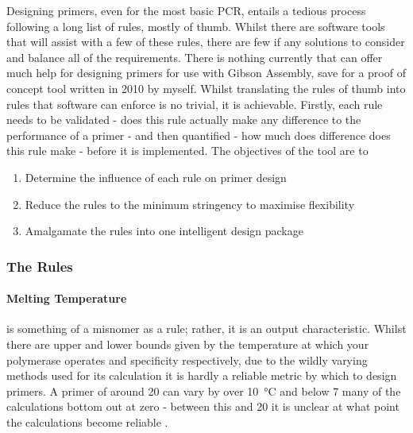 \documentclass[../main.tex]{subfiles}
\begin{document}
Designing primers, even for the most basic PCR, entails a tedious process following a long list of rules, mostly of thumb. Whilst there are software tools that will assist with a few of these rules, there are few if any solutions to consider and balance all of the requirements. There is nothing currently that can offer much help for designing primers for use with Gibson Assembly, save for a proof of concept tool written in 2010 by myself. Whilst translating the rules of thumb into rules that software can enforce is no trivial, it is achievable. Firstly, each rule needs to be validated - does this rule actually make any difference to the performance of a primer - and then quantified - how much does difference does this rule make - before it is implemented. The objectives of the tool are to 
\begin{enumerate}
\item{Determine the influence of each rule on primer design}
\item{Reduce the rules to the minimum stringency to maximise flexibility}
\item{Amalgamate the rules into one intelligent design package}
\end{enumerate}

\subsubsection{The Rules}

\paragraph{Melting Temperature} is something of a misnomer as a rule; rather, it is an output characteristic. Whilst there are upper and lower bounds given by the temperature at which your polymerase operates and specificity respectively, due to the wildly varying methods used for its calculation it is hardly a reliable metric by which to design primers. A primer of around \SI{20}{\base} can vary by over \SI{10}{\degreeCelsius} and below \SI{7}{\base} many of the calculations bottom out at zero - between this and \SI{20}{\base} it is unclear at what point the calculations become reliable .
\end{document}
